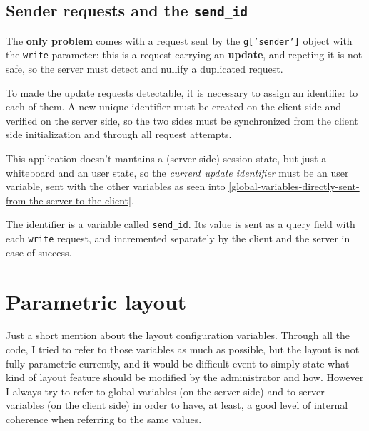 \documentclass[10pt,a4paper,english]{book}
\begin{document}

\hypertarget{sender-requests-and-the-send-id}{}
\subsection{Sender requests and the \texttt{send{\_}id}}
\label{sender-requests-and-the-send-id}

The \textbf{only problem} comes with a request sent by the \texttt{g{[}'sender'{]}}
object with the \texttt{write} parameter: this is a request carrying an
\textbf{update}, and repeting it is not safe, so the server must detect and
nullify a duplicated request.

To made the update requests detectable, it is necessary to assign an
identifier to each of them. A new unique identifier must be created on
the client side and verified on the server side, so the two sides must
be synchronized from the client side initialization and through all
request attempts.

This application doesn't mantains a (server side) session state, but
just a whiteboard and an user state, so the \emph{current update
identifier} must be an user variable, sent with the other variables as
seen into \href{\#global-variables-directly-sent-from-the-server-to-the-client}{\ref*{global-variables-directly-sent-from-the-server-to-the-client}}.

The identifier is a variable called \texttt{send{\_}id}. Its value is sent as
a query field with each \texttt{write} request, and incremented separately
by the client and the server in case of success.



\hypertarget{parametric-layout}{}
\section{Parametric layout}
\label{parametric-layout}

Just a short mention about the layout configuration variables. Through
all the code, I tried to refer to those variables as much as possible,
but the layout is not fully parametric currently, and it would be
difficult event to simply state what kind of layout feature should be
modified by the administrator and how. However I always try to refer
to global variables (on the server side) and to server variables (on
the client side) in order to have, at least, a good level of internal
coherence when referring to the same values.
\end{document}
